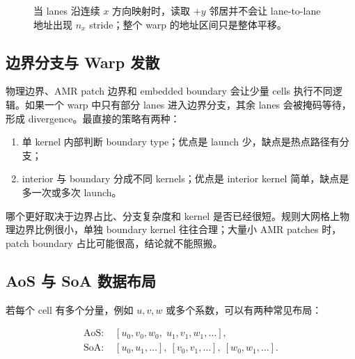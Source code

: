 \begin{figure}[htbp]
\centering
{}
\caption{当 lanes 沿连续 $x$ 方向映射时，读取 $+y$ 邻居并不会让 lane-to-lane 地址出现 $n_x$ stride；整个 warp 的地址区间只是整体平移。}
\label{fig:gpu-coalescing-offset}
\end{figure}

\subsection{边界分支与 Warp 发散}

物理边界、AMR patch 边界和 embedded boundary 会让少量 cells 执行不同逻辑。如果一个 warp 中只有部分 lanes 进入边界分支，其余 lanes 会被掩码等待，形成 divergence。最直接的策略有两种：

\begin{enumerate}
\item 单 kernel 内部判断 boundary type；优点是 launch 少，缺点是热点路径有分支；
\item interior 与 boundary 分成不同 kernels；优点是 interior kernel 简单，缺点是多一次或多次 launch。
\end{enumerate}

哪个更好取决于边界占比、分支复杂度和 kernel 是否已经很短。规则大网格上物理边界比例很小，单独 boundary kernel 往往合理；大量小 AMR patches 时，patch boundary 占比可能很高，结论就不能照搬。

\subsection{AoS 与 SoA 数据布局}

若每个 cell 有多个分量，例如 $u,v,w$ 或多个系数，可以有两种常见布局：

\begin{align}
\text{AoS: }& [u_0,v_0,w_0,\;u_1,v_1,w_1,\ldots],\\
\text{SoA: }& [u_0,u_1,\ldots],\ [v_0,v_1,\ldots],\ [w_0,w_1,\ldots].
\end{align}

